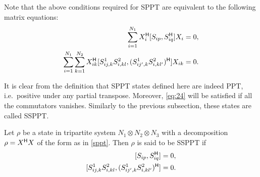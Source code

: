 Note that the above conditions required for SPPT are equivalent to the following   matrix equations:
\begin{equation}
  \label{eq:24}
  \begin{split}
    \sum_{i=1}^{N_1} X^{\mathsf{H}}_i [S_{ip},S^{\mathsf{H}}_{iq}]X_i & = 0,\\
    \sum_{i=1}^{N_1}\sum_{k=1}^{N_2} X^{\mathsf{H}}_{ik}   [ S^1_{ij,k}S^2_{i,kl},  (S^1_{ij',k}S^2_{i,kl'}) ^{\mathsf{H}}]
    X_{ik} &= 0 .
  \end{split}
\end{equation}

It is clear from the definition that  SPPT states defined here are indeed PPT, i.e.\ positive under any partial
transpose. Moreover,  \cref{eq:24} will be satisfied if all the commutators vanishes. Similarly to the previous
subsection, these states are called SSPPT.
\begin{defi}
 Let  $\rho$ be a state in tripartite system $N_1\otimes N_2 \otimes N_3$ with a   decomposition $\rho = X^{\mathsf{H}}
 X$  of the form as in \cref{sppt}. Then $\rho$ is said to be SSPPT if 
  \begin{equation}
    \label{eq:25}
    \begin{split}
      [S_{ip},\adj S_{iq}] &= 0,\\
      [ \sijkl{ij}{k}\sijklt{i}{kl},  \adj{(\sijkl{ij'}{k}\sijklt{i}{kl'}) }] & = 0.
    \end{split}
  \end{equation}
\end{defi}


